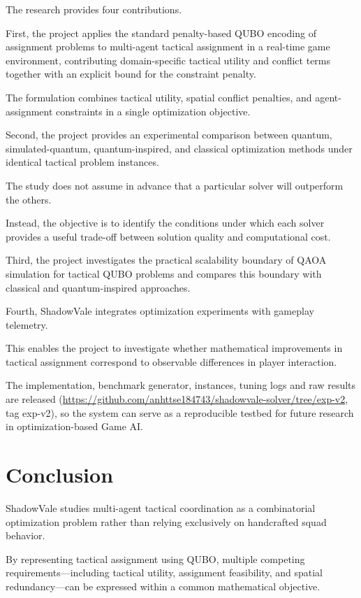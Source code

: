 \documentclass[12pt, a4paper]{article}
\begin{document}
The research provides four contributions.

First, the project applies the standard penalty-based QUBO encoding of assignment problems \cite{Glover2019} to multi-agent tactical assignment in a real-time game environment, contributing domain-specific tactical utility and conflict terms together with an explicit bound for the constraint penalty.

The formulation combines tactical utility, spatial conflict penalties, and agent-assignment constraints in a single optimization objective.

Second, the project provides an experimental comparison between quantum, simulated-quantum, quantum-inspired, and classical optimization methods under identical tactical problem instances.

The study does not assume in advance that a particular solver will outperform the others.

Instead, the objective is to identify the conditions under which each solver provides a useful trade-off between solution quality and computational cost.

Third, the project investigates the practical scalability boundary of QAOA simulation for tactical QUBO problems and compares this boundary with classical and quantum-inspired approaches.

Fourth, ShadowVale integrates optimization experiments with gameplay telemetry.

This enables the project to investigate whether mathematical improvements in tactical assignment correspond to observable differences in player interaction.

The implementation, benchmark generator, instances, tuning logs and raw results are released (\url{https://github.com/anhttse184743/shadowvale-solver/tree/exp-v2}, tag exp-v2), so the system can serve as a reproducible testbed for future research in optimization-based Game AI.

\section*{Conclusion}

ShadowVale studies multi-agent tactical coordination as a combinatorial optimization problem rather than relying exclusively on handcrafted squad behavior.

By representing tactical assignment using QUBO, multiple competing requirements---including tactical utility, assignment feasibility, and spatial redundancy---can be expressed within a common mathematical objective.
\end{document}
